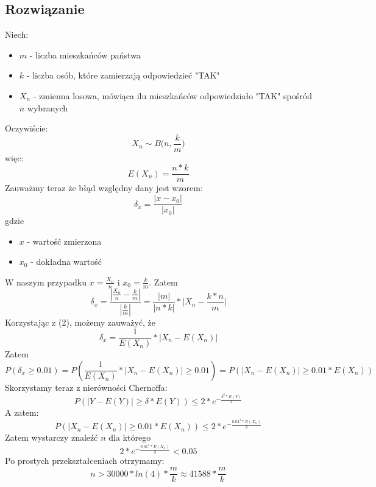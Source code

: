 \documentclass[10pt, a4paper]{article}
\begin{document}
\subsection*{Rozwiązanie}
Niech:
\begin{itemize}
\item $m$ - liczba mieszkańców państwa
\item $k$ - liczba osób, które zamierzają odpowiedzieć "TAK"
\item $X_n$ - zmienna losowa, mówiąca ilu mieszkańców odpowiedziało "TAK" spośród $n$ wybranych
\end{itemize}
Oczywiście:
\begin{equation}
X_n \sim B\Big(n, \frac{k}{m}\Big)
\end{equation}
więc:
\begin{equation}
E(X_n) = \frac{n*k}{m}
\end{equation}
Zauważmy teraz że błąd względny dany jest wzorem:
\begin{equation}
\delta_x=\frac{|x-x_0|}{|x_0|}
\end{equation}
gdzie
\begin{itemize}
\item $x$ - wartość zmierzona
\item $x_0$ - dokładna wartość
\end{itemize}
W naszym przypadku $x = \frac{X_n}{n}$ i $x_0 = \frac{k}{m}$. Zatem
\begin{equation}
\delta_x=\frac{|\frac{X_n}{n} - \frac{k}{m}|}{|\frac{k}{m}|} = \frac{|m|}{|n*k|} * \Big|X_n - \frac{k*n}{m}\Big|
\end{equation}
Korzystając z (2), możemy zauważyć, że
\begin{equation}
\delta_x = \frac{1}{E(X_n)} * |X_n - E(X_n)|
\end{equation}
Zatem
\begin{equation}
P(\delta_x \geq 0.01) = P(\frac{1}{E(X_n)} * |X_n - E(X_n)| \geq 0.01) = P(|X_n - E(X_n)| \geq 0.01 * E(X_n))
\end{equation}
Skorzystamy teraz z nierówności Chernoffa:
\begin{equation}
P(|Y - E(Y)| \geq \delta * E(Y)) \leq 2*e^{-\frac{\delta^2 * E(Y)}{3}}
\end{equation}
A zatem:
\begin{equation}
P(|X_n - E(X_n)| \geq 0.01 * E(X_n)) \leq 2*e^{-\frac{0.01^2 * E(X_n)}{3}}
\end{equation}
Zatem wystarczy znaleźć $n$ dla którego
\begin{equation}
2*e^{-\frac{0.01^2 * E(X_n)}{3}} < 0.05
\end{equation}
Po prostych przekształceniach otrzymamy:
\begin{equation}
n > 30000 * ln(4) * \frac{m}{k} \approx 41588 * \frac{m}{k}
\end{equation}
\end{document}
